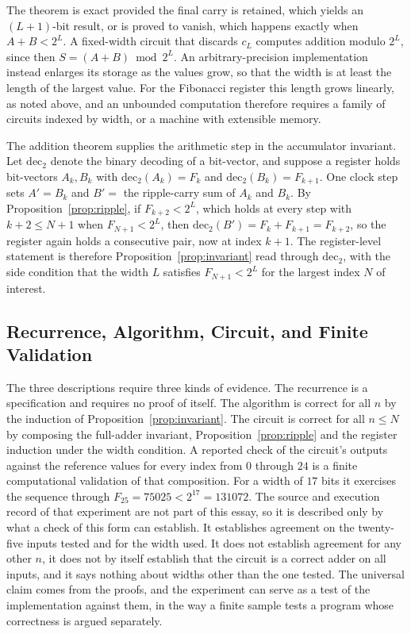 \documentclass[11pt]{article}
\theoremstyle{definition}
\theoremstyle{remark}
\begin{document}
The theorem is exact provided the final carry is retained, which yields an $(L+1)$-bit result, or is proved to vanish, which happens exactly when $A + B < 2^{L}$. A fixed-width circuit that discards $c_L$ computes addition modulo $2^{L}$, since then $S = (A+B) \bmod 2^{L}$. An arbitrary-precision implementation instead enlarges its storage as the values grow, so that the width is at least the length of the largest value. For the Fibonacci register this length grows linearly, as noted above, and an unbounded computation therefore requires a family of circuits indexed by width, or a machine with extensible memory.

The addition theorem supplies the arithmetic step in the accumulator invariant. Let $\mathrm{dec}_2$ denote the binary decoding of a bit-vector, and suppose a register holds bit-vectors $A_k, B_k$ with $\mathrm{dec}_2(A_k) = F_k$ and $\mathrm{dec}_2(B_k) = F_{k+1}$. One clock step sets $A' = B_k$ and $B' = $ the ripple-carry sum of $A_k$ and $B_k$. By Proposition~\ref{prop:ripple}, if $F_{k+2} < 2^{L}$, which holds at every step with $k+2 \le N+1$ when $F_{N+1} < 2^{L}$, then $\mathrm{dec}_2(B') = F_k + F_{k+1} = F_{k+2}$, so the register again holds a consecutive pair, now at index $k+1$. The register-level statement is therefore Proposition~\ref{prop:invariant} read through $\mathrm{dec}_2$, with the side condition that the width $L$ satisfies $F_{N+1} < 2^{L}$ for the largest index $N$ of interest.

\subsection{Recurrence, Algorithm, Circuit, and Finite Validation}

The three descriptions require three kinds of evidence. The recurrence is a specification and requires no proof of itself. The algorithm is correct for all $n$ by the induction of Proposition~\ref{prop:invariant}. The circuit is correct for all $n \le N$ by composing the full-adder invariant, Proposition~\ref{prop:ripple} and the register induction under the width condition. A reported check of the circuit's outputs against the reference values for every index from $0$ through $24$ is a finite computational validation of that composition. For a width of $17$ bits it exercises the sequence through $F_{25} = 75025 < 2^{17} = 131072$. The source and execution record of that experiment are not part of this essay, so it is described only by what a check of this form can establish. It establishes agreement on the twenty-five inputs tested and for the width used. It does not establish agreement for any other $n$, it does not by itself establish that the circuit is a correct adder on all inputs, and it says nothing about widths other than the one tested. The universal claim comes from the proofs, and the experiment can serve as a test of the implementation against them, in the way a finite sample tests a program whose correctness is argued separately.
\end{document}
